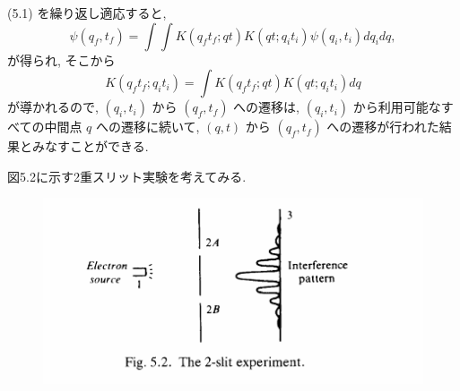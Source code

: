 \documentclass{jsarticle}
\begin{document}
(5.1) を繰り返し適応すると,
\begin{equation*}
    \psi(q_f, t_f) = \int\int K(q_{f}t_{f}; qt)K(qt; q_{i}t_{i})\psi(q_i, t_i)dq_{i}dq,
\end{equation*}
が得られ, そこから
\begin{equation*}
    K(q_{f}t_{f}; q_{i}t_{i}) = \int K(q_{f}t_{f}; qt)K(qt; q_{i}t_{i}) dq \tag{5.2}
\end{equation*}
が導かれるので, $(q_i, t_i)$ から $(q_f, t_f)$ への遷移は, $(q_i, t_i)$ から利用可能なすべての中間点 $q$ への遷移に続いて, $(q, t)$ から $(q_f, t_f)$ への遷移が行われた結果とみなすことができる.\par
図5.2に示す2重スリット実験を考えてみる. 

\begin{figure}[H]
    \centering
    \includegraphics[width=13cm]{figure/fig5-2.png}
\end{figure}
\end{document}
